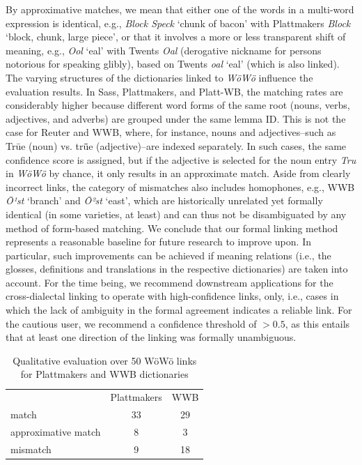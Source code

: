 \documentclass[11pt]{article}
\newcommand{\word}[1]{\textsl{#1}} %
\begin{document}
By approximative matches, we mean that either one of the words in a multi-word expression is identical, e.g., \word{Block Speck} `chunk of bacon' with Plattmakers \word{Block} `block, chunk, large piece', or that it involves a more or less transparent shift of meaning, e.g., \word{Ool} `eal' with Twents \word{Oal} (derogative nickname for persons notorious for speaking glibly), based on Twents \word{oal} `eal' (which is also linked). 
The varying structures of the dictionaries linked to \emph{WöWö} influence the evaluation results. In Sass, Plattmakers, and Platt-WB, the matching rates are considerably higher because different word forms of the same root (nouns, verbs, adjectives, and adverbs) are grouped under the same lemma ID. This is not the case for Reuter and WWB, where, for instance, nouns and adjectives--such as Trūe (noun) vs. trǖe (adjective)--are indexed separately. In such cases, the same confidence score is assigned, but if the adjective is selected for the noun entry \word{Tru} in \emph{WöWö} by chance, it only results in an approximate match. 
Aside from clearly incorrect links, the category of mismatches also includes homophones, e.g., WWB \word{Ō¹st} `branch' and \word{Ō²st} `east', which are historically unrelated yet formally identical (in some varieties, at least) and can thus not be disambiguated by any method of form-based matching.
We conclude that our formal linking method represents a reasonable baseline for future research to improve upon.
In particular, such improvements can be achieved if meaning relations (i.e., the glosses, definitions and translations in the respective dictionaries) are taken into account. 
For the time being, we recommend downstream applications for the cross-dialectal linking to operate with high-confidence links, only, i.e., cases in which the lack of ambiguity in the formal agreement indicates a reliable link. For the cautious user, we recommend a confidence threshold of $>0.5$, as this entails that at least one direction of the linking was formally unambiguous. 

\begin{table}
        \centering
        \begin{tabular}{lcc}
        & Plattmakers & WWB \\
        match & 33 & 29 \\
        approximative match & 8 & 3 \\
        mismatch & 9 & 18 \\
    \end{tabular}
    \caption{Qualitative evaluation over 50 WöWö links for Plattmakers and WWB dictionaries}
    \label{tab-eval}
\end{table}
\end{document}
